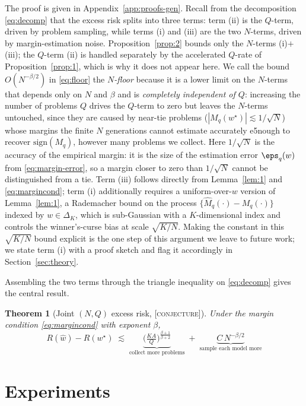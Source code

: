 \documentclass{article} %
\newtheorem{theorem}{Theorem}
\providecommand{\simplex}{\Delta_K}
\providecommand{\Risk}{R}
\providecommand{\Mhat}{\widehat{M}}
\providecommand{\what}{\widehat{w}}
\providecommand{\wstar}{w^{\star}}
\providecommand{\sign}{\mathrm{sign}}
\providecommand{\conjecture}{\textsc{[conjecture]}}
\providecommand{\conjecture}{}
\begin{document}
\noindent The proof is given in Appendix~\ref{app:proofs-gen}. Recall from the
decomposition \eqref{eq:decomp} that the excess risk splits into three terms:
term (ii) is the $Q$-term, driven by problem sampling, while terms (i) and (iii)
are the two $N$-terms, driven by margin-estimation noise. Proposition~\ref{prop:2}
bounds only the $N$-terms (i)$+$(iii); the $Q$-term (ii) is handled separately by
the accelerated $Q$-rate of Proposition~\ref{prop:1}, which is why it does not
appear here. We call the
bound $O(N^{-\beta/2})$ in \eqref{eq:floor} the \emph{$N$-floor} because it is a
lower limit on the $N$-terms that depends only on $N$ and $\beta$ and is
\emph{completely independent of $Q$}: increasing the number of problems $Q$
drives the $Q$-term to zero but leaves the $N$-terms untouched, since they are
caused by near-tie problems ($|M_q(\wstar)|\lesssim 1/\sqrt N$) whose margins the
finite $N$ generations cannot estimate accurately e5nough to recover $\sign(M_q)$,
however many problems we collect. Here $1/\sqrt N$ is the accuracy of the
empirical margin: it is the size of the estimation error $\eps_q(w)$ from
\eqref{eq:margin-error}, so a margin closer to zero than $1/\sqrt N$ cannot be
distinguished from a tie. Term (iii) follows directly from Lemma~\ref{lem:1} and
\eqref{eq:margincond}; term (i) additionally requires a uniform-over-$w$ version
of Lemma~\ref{lem:1}, a Rademacher bound on the process
$\{\Mhat_q(\cdot)-M_q(\cdot)\}$ indexed by $w\in\simplex$, which is sub-Gaussian
with a $K$-dimensional index and controls the winner's-curse bias at scale
$\sqrt{K/N}$. Making the constant in this $\sqrt{K/N}$ bound explicit is the one
step of this argument we leave to future work; we state term (i) with a proof
sketch and flag it accordingly in Section~\ref{sec:theory}.

Assembling the two terms through the triangle inequality on
\eqref{eq:decomp} gives the central result.

\begin{theorem}[Joint $(N,Q)$ excess risk, \conjecture]
\label{thm:main}
Under the margin condition \eqref{eq:margincond} with exponent $\beta$,
\begin{equation}
\label{eq:joint}
\boxed{\;
\Risk(\what) - \Risk(\wstar)
\;\lesssim\;
\underbrace{\Big(\tfrac{KA}{Q}\Big)^{\frac{\beta+1}{\beta+2}}}_{\text{collect more problems}}
\;+\;
\underbrace{C\,N^{-\beta/2}}_{\text{sample each model more}}
\;}
\end{equation}
\end{theorem}


\section{Experiments}
\label{sec:experiments}



\appendix




\end{document}
